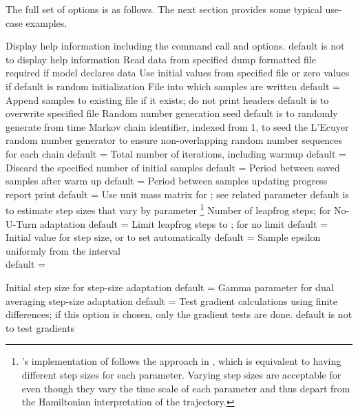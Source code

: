 The full set of options is as follows.  The next section provides
some typical use-case examples.
%
\begin{description}
{Display help information including the command call and
  options.}
{default is not to display help information}
%
{Read data from specified dump formatted
  file}
{required if model declares data}
%
{Use initial values from specified file or zero
  values if }
{default is random initialization}
%
{File into which samples are written}
{default = }
%
{Append samples to existing file if it exists; do not print headers}
{default is to overwrite specified file}
%
{Random number generation seed}
{default is to randomly generate from time}
%
{Markov chain identifier, indexed from 1, to seed the L'Ecuyer 
  random number generator to ensure non-overlapping random number
  sequences for each chain \citep{Lecuyer:1999}}
{default = }
%
{Total number of iterations, including warmup}
{default = }
%
{Discard the specified number of initial samples}
{default = }
%
{Period between saved samples after warm up}
{default = }
%
{Period between samples updating progress report print}
{default = }
%
 {Use unit mass matrix for \NUTS; see
  related parameter } {\NUTS default is to estimate 
  step sizes that vary by parameter}%
\footnote{\Stan's implementation of \NUTS follows the approach in
  \citep[section 5.4.2.4]{Neal:2011}, which is equivalent to having
  different step sizes for each parameter.  Varying step sizes are
  acceptable for \HMC even though they vary the time scale of each
  parameter and thus depart from the Hamiltonian interpretation of the
  trajectory.}
%
{Number of leapfrog steps;  for No-U-Turn adaptation}
{default = }
%
{Limit \NUTS leapfrog steps to ;  for no limit}
{default = }
%
{Initial value for step size, or  to set automatically}
{default = }
%
{Sample epsilon uniformly from the interval 
\\
}
{default = }


%
{Initial step size for step-size adaptation}
{default = }
%
{Gamma parameter for dual averaging step-size adaptation}
{default = }
%
{Test gradient calculations using finite differences; if this option
  is chosen, only the gradient tests are done.}
{default is not to test gradients}
%
\end{description}

